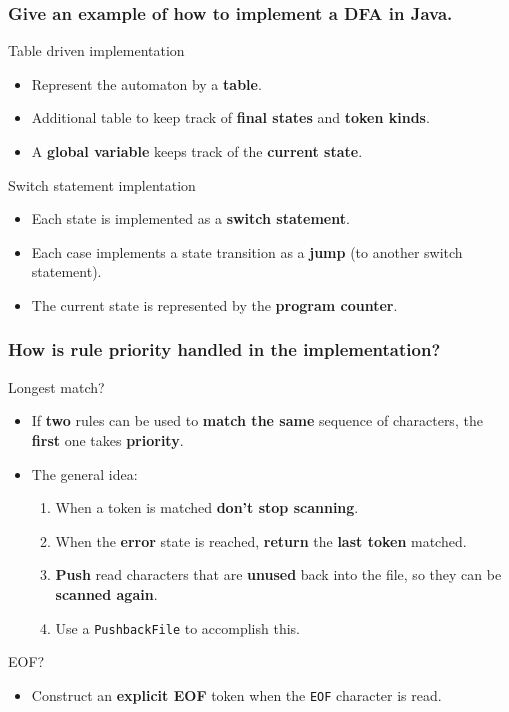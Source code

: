 \documentclass[11pt]{beamer}
\begin{document}
\begin{frame}
\frametitle{Give an example of how to implement a DFA in Java. }

\begin{block}{Table driven implementation}
\begin{itemize}
\item Represent the automaton by a \textbf{table}.
\item Additional table to keep track of \textbf{final states} and \textbf{token kinds}.
\item A \textbf{global variable} keeps track of the \textbf{current state}.
\end{itemize}
\end{block}

\begin{block}{Switch statement implentation}
\begin{itemize}
\item Each state is implemented as a \textbf{switch statement}.
\item Each case implements a state transition as a \textbf{jump} (to another switch statement).
\item The current state is represented by the \textbf{program counter}. 
\end{itemize}
\end{block}

\end{frame}


\begin{frame}
\frametitle{How is rule priority handled in the implementation?}
\begin{block}{Longest match?}
\begin{itemize}
\item If \textbf{two} rules can be used to \textbf{match the same} sequence of characters, the \textbf{first} one takes \textbf{priority}.
\item The general idea:
\begin{enumerate}
\item When a token is matched \textbf{don't stop scanning}.
\item When the \textbf{error} state is reached, \textbf{return} the \textbf{last token} matched.
\item \textbf{Push} read characters that are \textbf{unused} back into the file, so they can be \textbf{scanned again}.
\item Use a \texttt{PushbackFile} to accomplish this.
\end{enumerate}
\end{itemize}
\end{block}

\begin{block}{EOF?}
\begin{itemize}
\item Construct an \textbf{explicit EOF} token when the \texttt{EOF} character is read.
\end{itemize}
\end{block}

\end{frame}
\end{document}
